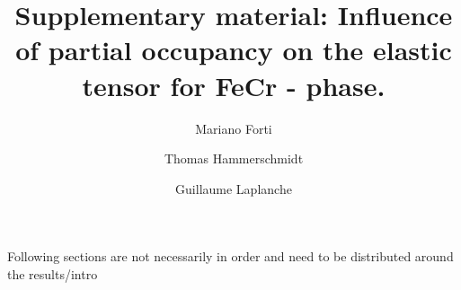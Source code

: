 \documentclass[superscriptaddress, 12pt]{revtex4-2}%
\date{}
\begin{document}
\title{Supplementary material: Influence of partial occupancy on the elastic tensor for FeCr \textsigma - phase.}

\author{Mariano Forti} 

\author{Thomas Hammerschmidt} \email{}

\author{Guillaume Laplanche} \email{}


Following sections are not necessarily in order and need to be distributed
around the results/intro

\maketitle
\end{document}
